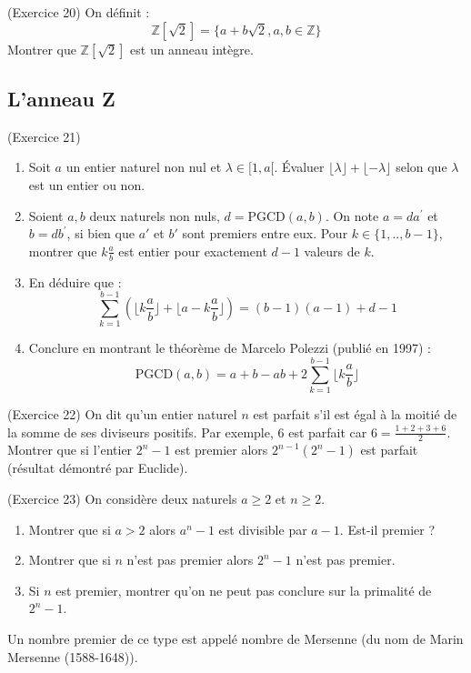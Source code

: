 \begin{exercice}
(Exercice 20)
On définit :
$$ \mathbb{Z}[\sqrt{2}]=\{a+b\sqrt{2},a,b\in\mathbb{Z}\} $$ 
Montrer que $\mathbb{Z}[\sqrt{2}]$ est un anneau intègre. 
\end{exercice}

\subsection{L'anneau Z}

\begin{exercice}
(Exercice 21)
\begin{enumerate}
 \item Soit $a$ un entier naturel non nul et $\lambda\in[1,a[$. Évaluer $\lfloor \lambda \rfloor + \lfloor -\lambda \rfloor$ selon que $\lambda$ est un entier ou non. 
 \item Soient $a, b$ deux naturels non nuls, $d=\text{PGCD}(a,b)$. 
 On note $a=da^{\prime}$ et $b=db^{\prime}$, si bien que $a'$ et $b'$ sont premiers entre eux. 
 Pour $k\in\{1,..,b-1\}$, montrer que $k\frac{a}{b}$ est entier pour exactement $d-1$ valeurs de $k$. 
 \item En déduire que :
 $$ \sum_{k=1}^{b-1}\left(\lfloor k\frac{a}{b}\rfloor+\lfloor a-k\frac{a}{b}\rfloor\right)=(b-1)(a-1)+d-1 $$ 
 \item Conclure en montrant le théorème de Marcelo Polezzi (publié en 1997) :
 $$ \text{PGCD}(a,b)=a+b-ab+2\sum_{k=1}^{b-1}\lfloor k\frac{a}{b}\rfloor $$ 
\end{enumerate}
\end{exercice}

\begin{exercice}
(Exercice 22)
On dit qu'un entier naturel $n$ est parfait s'il est égal à la moitié de la somme de ses diviseurs positifs. 
Par exemple, $6$ est parfait car $6=\frac{1+2+3+6}{2}$. 
Montrer que si l'entier $2^{n}-1$ est premier alors $2^{n-1}(2^{n}-1)$ est parfait (résultat démontré par Euclide). 
\end{exercice}

\begin{exercice}
(Exercice 23)
On considère deux naturels $a\ge2$ et $n\ge2$. 
\begin{enumerate}
 \item[a)] Montrer que si $a>2$ alors $a^{n}-1$ est divisible par $a-1$. Est-il premier ? 
 \item[b)] Montrer que si $n$ n'est pas premier alors $2^{n}-1$ n'est pas premier. 
 \item[c)] Si $n$ est premier, montrer qu'on ne peut pas conclure sur la primalité de $2^{n}-1$. 
\end{enumerate}
Un nombre premier de ce type est appelé nombre de Mersenne (du nom de Marin Mersenne (1588-1648)). 
\end{exercice}

